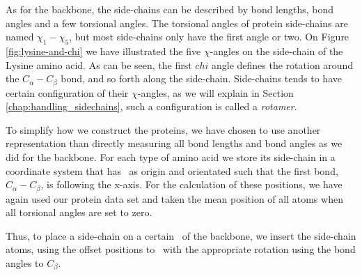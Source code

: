 As for the backbone, the side-chains can be described by bond lengths,
bond angles and a few torsional angles.  The torsional angles of
protein side-chains are named $\chi_1-\chi_5$, but most side-chains
only have the first angle or two. On Figure \ref{fig:lysine-and-chi}
we have illustrated the five $\chi$-angles on the side-chain of the
Lysine amino acid. As can be seen, the first $chi$ angle defines the
rotation around the $C_\alpha-C_\beta$ bond, and so forth along the
side-chain. Side-chains tends to have certain configuration of their
$\chi$-angles, as we will explain in Section
\ref{chap:handling_sidechains}, such a configuration is called a
\textit{rotamer}.

To simplify how we construct the proteins, we have chosen to use
another representation than directly measuring all bond lengths and
bond angles as we did for the backbone. For each type of amino acid we
store its side-chain in a coordinate system that has \Ca\ as origin and
orientated such that the first bond, $C_\alpha-C_\beta$, is following
the x-axis. For the calculation of these positions, we have again used
our protein data set and taken the mean position of all atoms when all
torsional angles are set to zero.

Thus, to place a side-chain on a certain \Ca\ of the backbone, we
insert the side-chain atoms, using the offset positions to \Ca\ with
the appropriate rotation using the bond angles to $C_\beta$.

